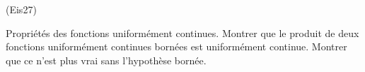 \begin{tiny}(Eis27)\end{tiny} Propriétés des fonctions uniformément continues.\newline
Montrer que le produit de deux fonctions uniformément continues bornées est uniformément continue. Montrer que ce n'est plus vrai sans l'hypothèse bornée.
